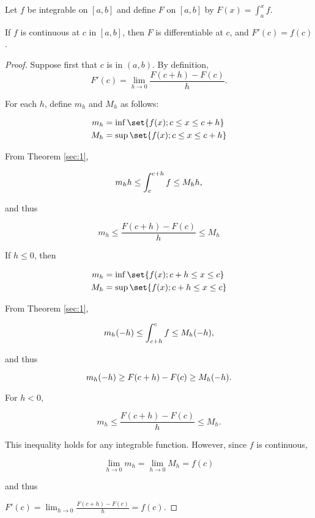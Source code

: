 \documentclass[11pt]{scrartcl}
\begin{document}
\begin{theorem}
  Let $f$ be integrable on $[a, b]$ and define $F$ on $[a, b]$ by
  $F(x) = \int_a^xf $.

  If $f$ is continuous at $c$ in $[a,b]$, then $F$ is differentiable
  at $c$, and $F'(c) = f(c)$.
\end{theorem}

\begin{proof}
  Suppose first that $c$ is in $(a, b)$. By definition,
  \begin{equation*}
    F'(c) = \lim_{h\to 0}\frac{F(c+h) - F(c)}{h}.
  \end{equation*}

  For each $h$, define $m_h$ and $M_{h}$ as follows:

  \begin{align}
    m_h &= \inf \set{f(x); c \leq x \leq c+h}\\
    M_{h} &= \sup \set{f(x); c \leq x \leq c+h}
  \end{align}

  From Theorem \ref{sec:1},


  \begin{equation*}
    m_h\* h \leq \int_c^{c+h} f \leq M_h\*h,
  \end{equation*}

  and thus

  \begin{equation*}
    m_h\leq \frac{F(c+h) - F(c)}{h}\leq M_h
  \end{equation*}

  If $h\leq 0$, then

  \begin{align}
    m_h &= \inf \set{f(x); c+h \leq x \leq c}\\
    M_{h} &= \sup \set{f(x); c+h \leq x \leq c}
  \end{align}

  From Theorem \ref{sec:1},


  \begin{equation*}
    m_h\* (-h) \leq \int_{c+h}^c f \leq M_h\*(-h),
  \end{equation*}

  and thus

  \begin{equation*}
    m_h\* (-h) \geq F(c+h) - F(c) \geq M_h\*(-h).
  \end{equation*}

  For $h<0$,

  \begin{equation*}
    m_h\leq \frac{F(c+h) - F(c)}{h}\leq M_h.
  \end{equation*}

  This inequality holds for any integrable function. However, since $f$
  is continuous,


  \begin{equation*}
    \lim_{h\to 0}m_{h} = \lim_{h\to 0} M_{h} = f(c)
  \end{equation*}

  and thus

  $F'(c)= \lim_{h\to 0}\frac{F(c+h) - F(c)}{h} = f(c)$.
\end{proof}
\end{document}
